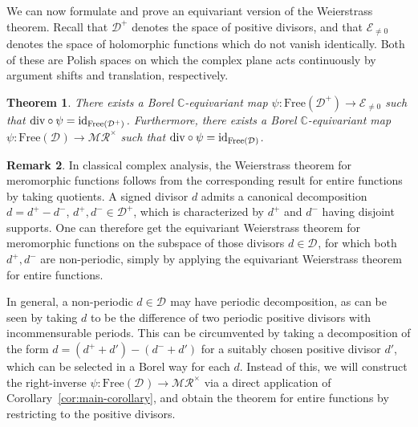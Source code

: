 \documentclass[12pt]{paper}
\numberwithin{equation}{section}
\theoremstyle{plain}
\newtheorem{theorem}{Theorem}[section]
\theoremstyle{definition}
\newtheorem{remark}[theorem]{Remark}
\newcommand{\C}{\mathbb{C}}
\newcommand{\merom}[1][]{\mathcal{MR}_{#1}}
\newcommand{\meromnz}{\merom^{\times}}
\newcommand{\holom}[1][]{\mathcal{E}_{#1}}
\newcommand{\divis}[1][]{\mathcal{D}_{#1}}
\newcommand{\divisp}[1][]{\divis[#1]^{+}}
\newcommand{\dm}{\mathrm{div}}      %
\newcommand{\free}{\mathrm{Free}}
\begin{document}
We can now formulate and prove an equivariant version of the Weierstrass theorem. Recall that
\(\divisp\) denotes the space of positive divisors, and that \(\holom[\ne0]\) denotes the space of
holomorphic functions which do not vanish identically. Both of these are Polish spaces on which the
complex plane acts continuously by argument shifts and translation, respectively.


\begin{theorem}
  \label{thm:equivariant-weierstrass}
  There exists a Borel \(\C\)-equivariant map \(\psi : \free(\divisp) \to \holom[\ne 0]\) such that
  \(\dm\circ \psi={\rm id}_{\free(\divisp)}\).  Furthermore, there exists a Borel \(\C\)-equivariant
  map \(\psi : \free(\divis) \to \meromnz\) such that \(\dm\circ\psi={\rm id}_{\free(\divis)}\).
\end{theorem}

\begin{remark}
  In classical complex analysis, the Weierstrass theorem for meromorphic functions follows from the
  corresponding result for entire functions by taking quotients. A signed divisor \(d\) admits a
  canonical decomposition \(d = d^{+} - d^{-}\), \(d^{+}, d^{-} \in \divisp\), which is
  characterized by \(d^{+}\) and \(d^{-}\) having disjoint supports. One can therefore get the
  equivariant Weierstrass theorem for meromorphic functions on the subspace of those divisors
  \(d \in \divis\), for which both \(d^{+}, d^{-}\) are non-periodic, simply by applying the
  equivariant Weierstrass theorem for entire functions.

  In general, a non-periodic \(d \in \divis\) may have periodic decomposition, as can be seen by
  taking \(d\) to be the difference of two periodic positive divisors with incommensurable periods.
  This can be circumvented by taking a decomposition of the form
  \(d = (d^{+} + d') - (d^{-} + d') \) for a suitably chosen positive divisor \(d'\), which can be
  selected in a Borel way for each \(d\). Instead of this, we will construct the right-inverse
  \(\psi : \free(\divis) \to \meromnz\) via a direct application of
  Corollary~\ref{cor:main-corollary}, and obtain the theorem for entire functions by restricting to
  the positive divisors.
\end{remark}
\end{document}
